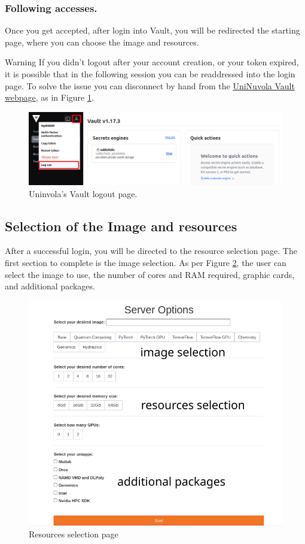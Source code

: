 \subsubsection{Following accesses.}
Once you get accepted, after login into Vault, you will be redirected the  starting page, where you can choose the image and resources.

\begin{bclogo}[logo=\bcinfo, couleurBarre=orange, noborder=true, couleur=white]{Warning}
If you didn't logout after your account creation, or your token expired, it is possible that in the following session
you can be readdressed into the login page. To solve the issue you can disconnect by hand from the \href{https://vault.uninuvola.unipg.it:8200}{UniNuvola Vault webpage}, as in Figure \ref{img:logout}.
\end{bclogo}

\begin{figure}[!ht]
    \center
    \includegraphics[width=0.8\linewidth]{img/vault.png}
    \caption{Uninvola's Vault logout page.}
    \label{img:logout}
\end{figure}


\subsection{Selection of the Image and resources}

After a successful login, you will be directed to the resource selection page. The first section to complete is the
image selection. As per Figure \ref{fig:resources}, the user can select the image to use, the number of cores and RAM required, graphic cards, and additional packages.

\begin{figure}[!ht]
    \centering
    \includegraphics[width=0.75\linewidth]{img/resource_selection.png}
    \caption{Resources selection page}
    \label{fig:resources}
\end{figure}

